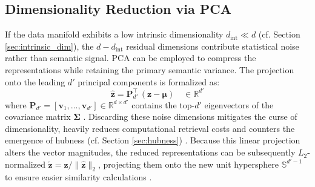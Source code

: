 \subsection{Dimensionality Reduction via \ac{PCA}}
\label{sec:theory_pca}


If the data manifold exhibits a low intrinsic dimensionality $d_{\mathrm{int}} \ll d$ (cf. Section \ref{sec:intrinsic_dim}), the $d - d_{\mathrm{int}}$ residual dimensions contribute statistical noise rather than semantic signal. \ac{PCA} can be employed to compress the representations while retaining the primary semantic variance. The projection onto the leading $d'$ principal components is formalized as:
\begin{equation}
    \hat{\mathbf{z}} = \mathbf{P}_{d'}^\top\,(\mathbf{z} - \boldsymbol{\mu}) \quad \in \mathbb{R}^{d'}
    \label{eq:pca_proj}
\end{equation}
where $\mathbf{P}_{d'} = [\mathbf{v}_1, \dots, \mathbf{v}_{d'}] \in \mathbb{R}^{d \times d'}$ contains the top-$d'$ eigenvectors of the covariance matrix $\boldsymbol{\Sigma}$ \citep[p. 317 f.]{deisenroth2020mathematics}\cite{raunak_2019effective}. Discarding these noise dimensions mitigates the curse of dimensionality, heavily reduces computational retrieval costs and counters the emergence of hubness (cf. Section \ref{sec:hubness}) \cite{Radovanovic2010_Hubs}. Because this linear projection alters the vector magnitudes, the reduced representations can be subsequently $L_2$-normalized $\check{\mathbf{z}} = \hat{\mathbf{z}} / \|\hat{\mathbf{z}}\|_2$, projecting them onto the new unit hypersphere $\mathbb{S}^{d'-1}$ to ensure easier similarity calculations \citep[p. 321 f.]{deisenroth2020mathematics}\cite{raunak_2019effective}.


